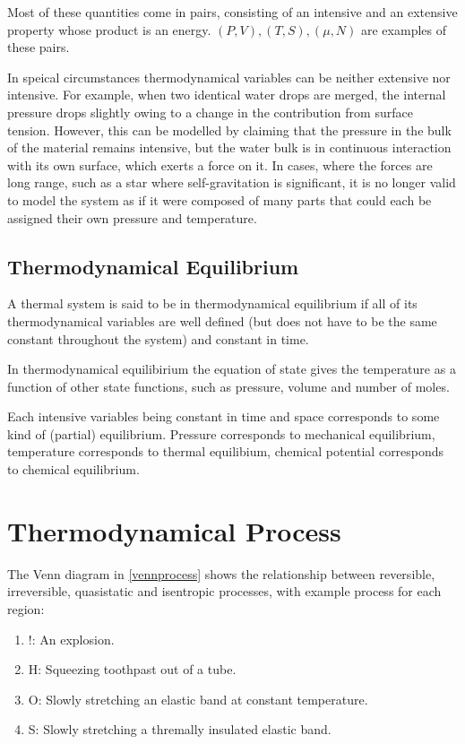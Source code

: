 \documentclass[english,a4paper,12pt]{report}
\begin{document}
Most of these quantities come in pairs, consisting of an intensive and an extensive property whose product is an energy. \((P,V), (T,S), (\mu ,N)\) are examples of these pairs.  

In speical circumstances thermodynamical variables can be neither extensive nor intensive. For example, when two identical water drops are merged, the internal pressure drops slightly owing to a change in the contribution from surface tension. However, this can be modelled by claiming that the pressure in the bulk of the material remains intensive, but the water bulk is in continuous interaction with its own surface, which exerts a force on it. In cases, where the forces are long range, such as a star where self-gravitation is significant, it is no longer valid to model the system as if it were composed of many parts that could each be assigned their own pressure and temperature. 

\subsection{Thermodynamical Equilibrium}

A thermal system is said to be in thermodynamical equilibrium if all of its thermodynamical variables are well defined (but does not have to be the same constant throughout the system) and constant in time. 

In thermodynamical equilibirium the equation of state gives the temperature as a function of other state functions, such as pressure, volume and number of moles. 

Each intensive variables being constant in time and space corresponds to some kind of (partial) equilibrium. Pressure corresponds to mechanical equilibrium, temperature corresponds to thermal equilibium, chemical potential corresponds to chemical equilibrium.

\section{Thermodynamical Process}

The Venn diagram in \cref{vennprocess} shows the relationship between reversible, irreversible, quasistatic and isentropic processes, with example process for each region:

\begin{enumerate}
    \item !: An explosion.
    \item H: Squeezing toothpast out of a tube.
    \item O: Slowly stretching an elastic band at constant temperature.
    \item S: Slowly stretching a thremally insulated elastic band.
\end{enumerate}
\end{document}
